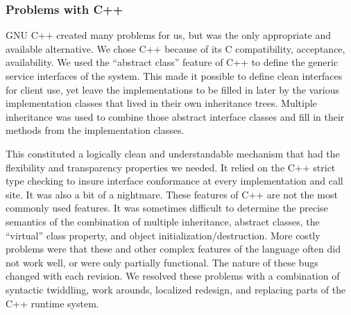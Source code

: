 \subsubsection{Problems with C++}
GNU C++ created many problems for us, but was the only appropriate
and available alternative. We chose C++
because of its C compatibility, acceptance, availability.  We used the
``abstract class'' feature of C++ to define the generic service interfaces
of the system.  This made it possible to define clean interfaces for
client use, yet leave the implementations to be filled in later by the various
implementation classes that lived in their own inheritance trees.
Multiple inheritance was used to combine those abstract interface classes and
fill in their methods from the implementation classes.

This constituted a logically clean and understandable mechanism that had the
flexibility and transparency properties we needed.  It relied on the C++
strict type checking to insure interface conformance at every implementation
and call site.  It was also a
bit of a nightmare.  These features of C++ are not the most commonly used
features.  It was sometimes difficult to determine the precise
semantics of the combination of multiple inheritance, abstract classes,
the ``virtual'' class property, and object initialization/destruction.
More costly problems were that these and other complex features of the
language often did not work well, or were only partially functional.
The nature of these bugs changed with each revision.  We resolved these 
problems with a combination of syntactic twiddling,
work arounds, localized redesign, and
replacing parts of the C++ runtime system.

